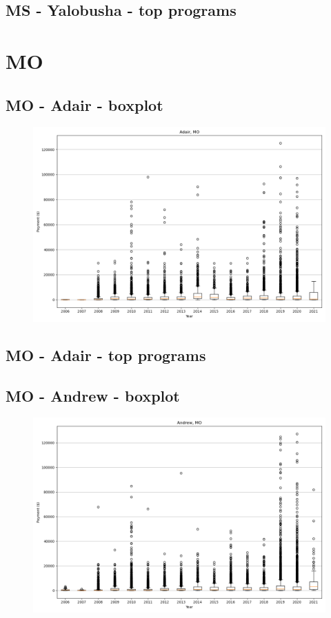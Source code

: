 \subsection*{MS - Yalobusha - top programs}

\newpage
\section*{MO}
\subsection*{MO - Adair - boxplot}
\begin{figure}[h]
\centering
\includegraphics[width=7in]{../output/boxplots/counties/Adair-MO_boxplot.png}
\end{figure}


\subsection*{MO - Adair - top programs}

\newpage
\subsection*{MO - Andrew - boxplot}
\begin{figure}[h]
\centering
\includegraphics[width=7in]{../output/boxplots/counties/Andrew-MO_boxplot.png}
\end{figure}


